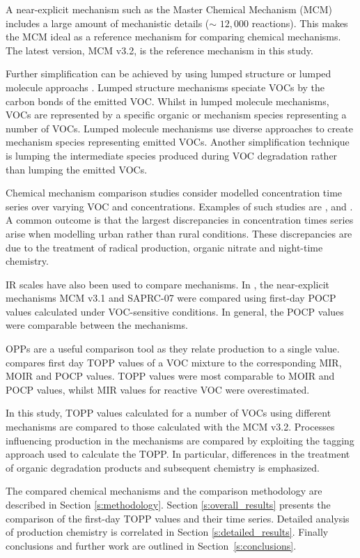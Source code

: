 A near-explicit mechanism such as the Master Chemical Mechanism (MCM) \citep{Jenkin:2003, Saunders:2003, Bloss:2005} includes a large amount of mechanistic details ($\sim$ $12,000$ reactions). 
This makes the MCM ideal as a reference mechanism for comparing chemical mechanisms. 
The latest version, MCM v3.2, \citep{MCM_Site} is the reference mechanism in this study.

Further simplification can be achieved by using lumped structure or lumped molecule approachs \citep{Dodge:2000}. 
Lumped structure mechanisms speciate VOCs by the carbon bonds of the emitted VOC. 
Whilst in lumped molecule mechanisms, VOCs are represented by a specific organic or mechanism species representing a number of VOCs. 
Lumped molecule mechanisms use diverse approaches to create mechanism species representing emitted VOCs.  
Another simplification technique is lumping the intermediate species produced during VOC degradation rather than lumping the emitted VOCs.

Chemical mechanism comparison studies consider modelled  concentration time series over varying VOC and  concentrations. 
Examples of such studies are \citet{Dunker:1984}, \citet{Kuhn:1998} and \citet{Emmerson:2009}.
A common outcome is that the largest discrepancies in  concentration times series arise when modelling urban rather than rural conditions.
These discrepancies are due to the treatment of radical production, organic nitrate and night-time chemistry.

IR scales have also been used to compare mechanisms.
In \citet{Derwent:2010}, the near-explicit mechanisms MCM v3.1 and SAPRC-07 were compared using first-day POCP values calculated under VOC-sensitive conditions. 
In general, the POCP values were comparable between the mechanisms. 

OPPs are a useful comparison tool as they relate  production to a single value. 
\citet{Butler:2011} compares first day TOPP values of a VOC mixture to the corresponding MIR, MOIR and POCP values.
TOPP values were most comparable to MOIR and POCP values, whilst MIR values for reactive VOC were overestimated.

In this study, TOPP values calculated for a number of VOCs using different mechanisms are compared to those calculated with the MCM v3.2. 
Processes influencing  production in the mechanisms are compared by exploiting the tagging approach used to calculate the TOPP.
In particular, differences in the treatment of organic degradation products and subsequent chemistry is emphasized.

The compared chemical mechanisms and the comparison methodology are described in Section \ref{s:methodology}. 
Section \ref{s:overall_results} presents the comparison of the first-day TOPP values and their time series. 
Detailed analysis of  production chemistry is correlated in Section \ref{s:detailed_results}. 
Finally conclusions and further work are outlined in \mbox{Section \ref{s:conclusions}}.  
